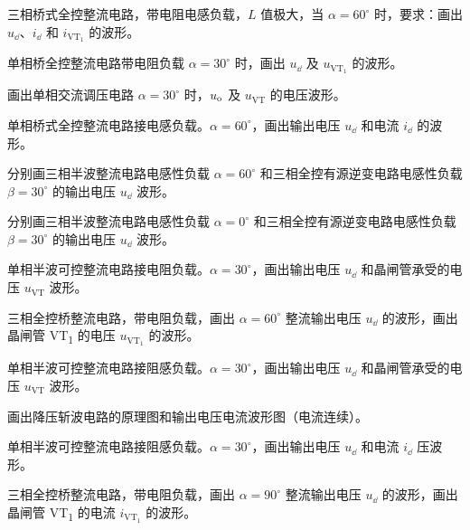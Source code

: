 \documentclass[电力电子]{subfiles}
\begin{document}
\begin{ti}[15 分]
	三相桥式全控整流电路，带电阻电感负载，$L$ 值极大，当 $\alpha = 60^\circ$ 时，要求：画出 $u_{\dd}$、$i_{\dd}$ 和 $i_{\mathrm{VT_{1}}}$ 的波形。
\end{ti}

\begin{ti}[10 分]
	单相桥全控整流电路带电阻负载 $\alpha = 30^\circ$ 时，画出 $u_{\dd}$ 及 $u_{\mathrm{VT}_{1}}$ 的波形。
\end{ti}

\begin{ti}[10 分]
	画出单相交流调压电路 $\alpha = 30^\circ$ 时，$u_{\mathrm{o}}$ 及 $u_{\mathrm{VT}}$ 的电压波形。
\end{ti}

\begin{ti}[10 分]
	单相桥式全控整流电路接电感负载。$\alpha = 60^\circ$，画出输出电压 $u_{\dd}$ 和电流 $i_{\dd}$ 的波形。
\end{ti}

\begin{ti}[10 分]
	分别画三相半波整流电路电感性负载 $\alpha = 60^\circ$ 和三相全控有源逆变电路电感性负载 $\beta = 30^\circ$ 的输出电压 $u_{\dd}$ 波形。
\end{ti}

\begin{ti}[10 分]
	分别画三相半波整流电路电感性负载 $\alpha = 0^\circ$ 和三相全控有源逆变电路电感性负载 $\beta = 30^\circ$ 的输出电压 $u_{\dd}$ 波形。
\end{ti}

\begin{ti}[10 分]
	单相半波可控整流电路接电阻负载。$\alpha = 30^\circ$，画出输出电压 $u_{\dd}$ 和晶闸管承受的电压 $u_{\mathrm{VT}}$ 波形。
\end{ti}

\begin{ti}[10 分]
	三相全控桥整流电路，带电阻负载，画出 $\alpha = 60^\circ$ 整流输出电压 $u_{\dd}$ 的波形，画出晶闸管 VT\textsubscript{1} 的电压 $u_{\mathrm{VT}_{1}}$ 的波形。
\end{ti}

\begin{ti}[10 分]
	单相半波可控整流电路接阻感负载。$\alpha = 30^\circ$，画出输出电压 $u_{\dd}$ 和晶闸管承受的电压 $u_{\mathrm{VT}}$ 波形。
\end{ti}

\begin{ti}[10 分]
	画出降压斩波电路的原理图和输出电压电流波形图（电流连续）。
\end{ti}

\begin{ti}[10 分]
	单相半波可控整流电路接阻感负载。$\alpha = 30^\circ$，画出输出电压 $u_{\dd}$ 和电流 $i_{\dd}$ 压波形。
\end{ti}

\begin{ti}[10 分]
	三相全控桥整流电路，带电阻负载，画出 $\alpha = 90^\circ$ 整流输出电压 $u_{\dd}$ 的波形，画出晶闸管 VT\textsubscript{1} 的电流 $i_{\mathrm{VT}_{1}}$ 的波形。
\end{ti}
\end{document}

